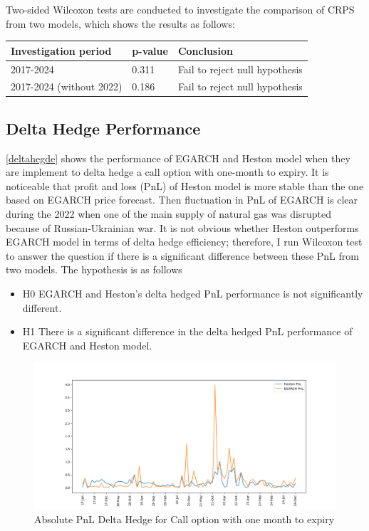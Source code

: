\documentclass[12pt,a4paper]{article}
\newcommand\colorAutoref[1]{{\hypersetup{linkcolor=black}\autoref{#1}}}
\numberwithin{equation}{section}
\begin{document}
Two-sided Wilcoxon tests are conducted to investigate the comparison of CRPS from two models, which shows the results as follows:

\begin{table}[h!]
\centering
\begin{tabular}{@{}lll@{}}
\toprule
Investigation period     & p-value & Conclusion                     \\ \midrule
2017-2024                & 0.311    & Fail to reject null hypothesis \\
2017-2024 (without 2022) & 0.186    & Fail to reject null hypothesis \\ \bottomrule
\end{tabular}
\end{table}

\subsection{Delta Hedge Performance}


\colorAutoref{deltahegde} shows the performance of EGARCH and Heston model when they are implement to delta hedge a call option with one-month to expiry. It is noticeable that profit and loss (PnL) of Heston model is more stable than the one based on EGARCH price forecast. Then fluctuation in PnL of EGARCH is clear during the 2022 when one of the main supply of natural gas was disrupted because of Russian-Ukrainian war. It is not obvious whether Heston outperforms EGARCH model in terms of delta hedge efficiency; therefore, I run Wilcoxon test to answer the question if there is a significant difference between these PnL from two models. The hypothesis is as follows

\begin{itemize}
\item H0 EGARCH and Heston's delta hedged PnL performance is not significantly different.
\item H1 There is a significant difference in the delta hedged PnL performance of EGARCH and Heston model.
\end{itemize}



\begin{figure}[h!] 
\includegraphics[scale=1,width=1\linewidth,height=0.4\textheight]{deltahedge_pnl.png}
\caption{Absolute PnL Delta Hedge for Call option with one month to expiry}
\label{deltahegde}
\end{figure}
\end{document}
